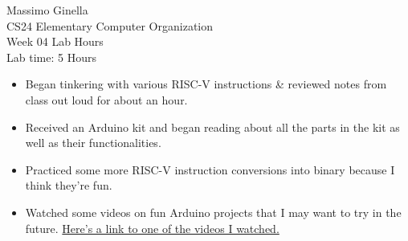 \documentclass[12pt]{article}
\begin{document}
	\begin{center}
		Massimo Ginella \\
		CS24 Elementary Computer Organization \\
		Week 04 Lab Hours \\
		Lab time: 5 Hours \vspace{0.5cm} \\
	\end{center}
		
	\begin{itemize}
		\item Began tinkering with various RISC-V instructions \& reviewed notes from class out loud for about an hour.
		\item Received an Arduino kit and began reading about all the parts in the kit as well as their functionalities.
		\item Practiced some more RISC-V instruction conversions into binary because I think they're fun.
		\item Watched some videos on fun Arduino projects that I may want to try in the future. 
		\href{https://www.youtube.com/watch?v=LwZ35wZJreU}{Here's a link to one of the videos I watched.}
	\end{itemize}
		
	
	
\end{document}
